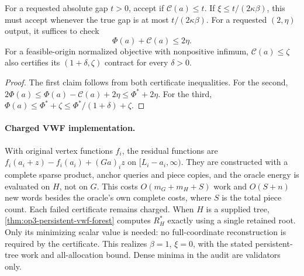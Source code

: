 \begin{corollary}
\label{cor:op3-spectral-vwf-stopping}
For a requested absolute gap $t>0$, accept if $\mathcal C(a)\leq t$.
If $\xi\leq t/(2\kappa\beta)$, this must accept whenever the true
gap is at most $t/(2\kappa\beta)$.
For a requested $(2,\eta)$ output, it suffices to check
\[
 \Phi(a)+\mathcal C(a)\leq2\eta.
\]
For a feasible-origin normalized objective with nonpositive infimum,
$\mathcal C(a)\leq\zeta$ also certifies its $(1+\delta,\zeta)$
contract for every $\delta>0$.
\end{corollary}
\begin{proof}
The first claim follows from both certificate inequalities.
For the second,
$2\Phi(a)\leq\Phi(a)-\mathcal C(a)+2\eta\leq\Phi^*+2\eta$.
For the third, $\Phi(a)\leq\Phi^*+\zeta
\leq\Phi^*/(1+\delta)+\zeta$.
\end{proof}

\paragraph{Charged VWF implementation.}
With original vertex functions $f_i$, the residual functions are
$f_i(a_i+z)-f_i(a_i)+(Ga)_iz$ on $[L_i-a_i,\infty)$.
They are constructed with a complete sparse product, anchor queries and
piece copies, and the oracle energy is evaluated on $H$, not on $G$.
This costs $O(m_G+m_H+S)$ work and $O(S+n)$ new words besides the
oracle's own complete costs, where $S$ is the total piece count.
Each failed certificate remains charged. When $H$ is a supplied tree,
\cref{thm:op3-persistent-vwf-forest} computes $R_H^*$ exactly using a
single retained root. Only its minimizing scalar value is needed:
no full-coordinate reconstruction is required by the certificate.
This realizes $\beta=1$, $\xi=0$, with the stated persistent-tree work
and all-allocation bound. Dense minima in the audit are validators only.

